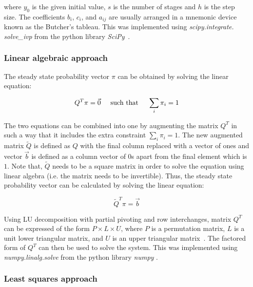 where \(y_0\) is the given initial value, \(s\) is the number of stages and
\(h\) is the step size.
The coefficients \(b_i\), \(c_i\), and \(a_{ij}\) are usually arranged in a
mnemonic device known as the Butcher's tableau.
This was implemented using \textit{scipy.integrate. solve\_ivp} from the python
library \textit{SciPy}~\cite{2020SciPy-NMeth}.


\subsubsection{Linear algebraic approach}

The steady state probability vector \( \pi \) can be obtained by solving the
linear equation:

\begin{equation}\label{eq:numpy_linalg_solve_1}
    Q^T \pi = \vec{0} \hspace{0.5cm} \text{such that} \hspace{0.5cm} 
    \sum_{i} \pi_i = 1
\end{equation}

The two equations can be combined into one by augmenting the matrix \( Q^T \)
in such a way that it includes the extra constraint \( \sum_i \pi_i = 1 \).
The new augmented matrix \(\tilde Q\) is defined as \(Q\) with the final
column replaced with a vector of ones and vector \(\vec{b}\) is defined
as a column vector of \(0\)s apart from the final element which is \(1\).
Note that, \(\tilde Q\) needs to be a square matrix in order to solve the
equation using linear algebra (i.e. the matrix needs to be invertible).
Thus, the steady state probability vector can be calculated by solving the
linear equation:

\begin{equation}
    \tilde Q^T \pi = \vec{b}
\end{equation}

Using LU decomposition with partial pivoting and row interchanges, matrix
\(Q^T\) can be expressed of the form \(P \times L \times U\), where \(P\) is
a permutation matrix, \(L\) is a unit lower triangular matrix, and \(U\) is
an upper triangular matrix~\cite{strang2006linear}.
The factored form of \(Q^T\) can then be used to solve the system.
This was implemented using \textit{numpy.linalg.solve} from the
python library \textit{numpy} \cite{2020NumPy-Array} \cite{lapack99}.


\subsubsection{Least squares approach}

